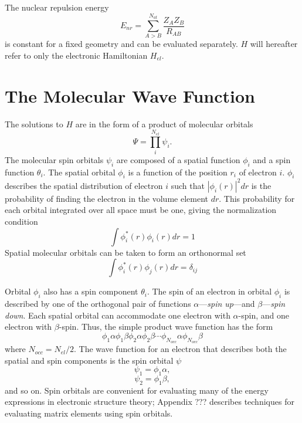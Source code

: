The nuclear repulsion energy
\begin{equation}
  E_{nr} = \sum_{A>B}^{N_{at}} \frac{Z_AZ_B}{R_{AB}}
\end{equation}
is constant for a fixed geometry and can be evaluated
separately. $H$ will hereafter refer to only the electronic
Hamiltonian $H_{el}$.

\section{The Molecular Wave Function}
The solutions to $H$ are in the form of a product of molecular
orbitals 
\begin{equation}
  \Psi = \prod_i^{N_{el}} \psi_i.
\end{equation}
The molecular spin orbitals $\psi_i$ are composed of a
spatial function $\phi_i$ and a spin function $\theta_i$. The spatial
orbital $\phi_i$ is a function of the position $r_i$ of electron
$i$. $\phi_i$ describes the spatial distribution of electron $i$ such
that $|\phi_i(r)|^2dr$ is the probability of finding the electron in
the volume element $dr$. This probability for each orbital integrated
over all space must be one, giving the normalization condition
\begin{equation}
  \int\phi_i^*(r)\phi_i(r)dr = 1
\end{equation}
Spatial molecular orbitals can be taken to form an
orthonormal set 
\begin{equation}
  \int\phi_i^*(r)\phi_j(r)dr = \delta_{ij}
\end{equation}

Orbital $\phi_i$ also has a spin component $\theta_i$. The
spin of an electron in orbital $\phi_i$ is described by one of the
orthogonal pair of functions $\alpha$---\emph{spin up}---and
$\beta$---\emph{spin down}. 
Each spatial orbital can accommodate one
electron with $\alpha$-spin, and one electron with $\beta$-spin. Thus,
the simple product wave function has the form 
\begin{equation}
	\phi_1\alpha\phi_1\beta\phi_2\alpha\phi_2\beta\cdots
	\phi_{N_{occ}}\alpha\phi_{N_{occ}}\beta
\label{eq:prodwfn}
\end{equation}
where $N_{occ} = N_{el}/2$. The wave function for an
electron that describes both the spatial and spin components is the
spin orbital $\psi$
\begin{equation}
	\psi_1 = \phi_1\alpha, 
\end{equation}
\begin{equation}
	\psi_2 = \phi_1\beta,  
\end{equation}
and so on.  Spin orbitals are convenient for evaluating many
of the energy expressions in electronic structure theory; Appendix ???
describes techniques for evaluating matrix elements using spin
orbitals.


